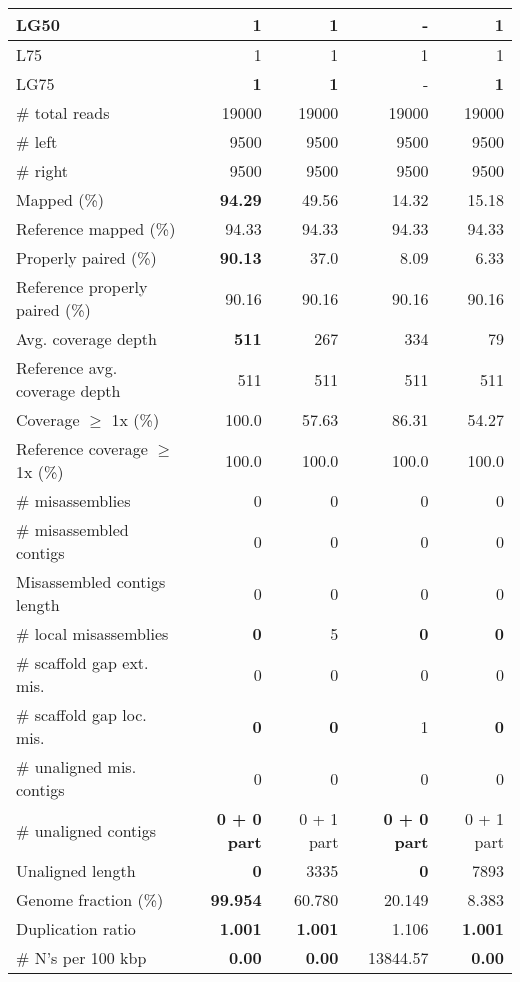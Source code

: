\documentclass[12pt,a4paper]{article}
\begin{document}
\begin{table}[ht]
\begin{center}
\begin{tabular}{|l*{4}{|r}|}
LG50 & {\bf 1} & {\bf 1} & - & {\bf 1} \\ \hline
L75 & 1 & 1 & 1 & 1 \\ \hline
LG75 & {\bf 1} & {\bf 1} & - & {\bf 1} \\ \hline
\# total reads & 19000 & 19000 & 19000 & 19000 \\ \hline
\# left & 9500 & 9500 & 9500 & 9500 \\ \hline
\# right & 9500 & 9500 & 9500 & 9500 \\ \hline
Mapped (\%) & {\bf 94.29} & 49.56 & 14.32 & 15.18 \\ \hline
Reference mapped (\%) & 94.33 & 94.33 & 94.33 & 94.33 \\ \hline
Properly paired (\%) & {\bf 90.13} & 37.0 & 8.09 & 6.33 \\ \hline
Reference properly paired (\%) & 90.16 & 90.16 & 90.16 & 90.16 \\ \hline
Avg. coverage depth & {\bf 511} & 267 & 334 & 79 \\ \hline
Reference avg. coverage depth & 511 & 511 & 511 & 511 \\ \hline
Coverage $\geq$ 1x (\%) & 100.0 & 57.63 & 86.31 & 54.27 \\ \hline
Reference coverage $\geq$ 1x (\%) & 100.0 & 100.0 & 100.0 & 100.0 \\ \hline
\# misassemblies & 0 & 0 & 0 & 0 \\ \hline
\# misassembled contigs & 0 & 0 & 0 & 0 \\ \hline
Misassembled contigs length & 0 & 0 & 0 & 0 \\ \hline
\# local misassemblies & {\bf 0} & 5 & {\bf 0} & {\bf 0} \\ \hline
\# scaffold gap ext. mis. & 0 & 0 & 0 & 0 \\ \hline
\# scaffold gap loc. mis. & {\bf 0} & {\bf 0} & 1 & {\bf 0} \\ \hline
\# unaligned mis. contigs & 0 & 0 & 0 & 0 \\ \hline
\# unaligned contigs & {\bf 0 + 0 part} & 0 + 1 part & {\bf 0 + 0 part} & 0 + 1 part \\ \hline
Unaligned length & {\bf 0} & 3335 & {\bf 0} & 7893 \\ \hline
Genome fraction (\%) & {\bf 99.954} & 60.780 & 20.149 & 8.383 \\ \hline
Duplication ratio & {\bf 1.001} & {\bf 1.001} & 1.106 & {\bf 1.001} \\ \hline
\# N's per 100 kbp & {\bf 0.00} & {\bf 0.00} & 13844.57 & {\bf 0.00} \\ \hline

\end{tabular}
\end{center}
\end{table}
\end{document}
